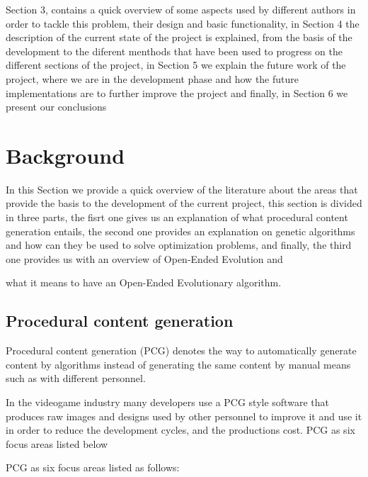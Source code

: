 \documentclass[conference]{IEEEtran}
\begin{document}
Section 3, contains a quick overview of some aspects used by different authors
in order to tackle this problem, their design and basic functionality, in
Section 4 the description of the current state of the project is explained, from
the basis of the development to the diferent menthods that have been used to
progress on the different sections of the project, 
in Section 5 we explain the
future work of the project, where we are in the development phase and how the
future implementations are to further improve the project and finally, in
Section 6 we present our conclusions
 

\section{Background}

In this Section we provide a quick overview of the literature about the areas
that provide the basis to the development of the current project, this section
is divided in three parts, the fisrt one gives us an explanation of what
procedural content generation entails, the second one provides an explanation on
genetic algorithms and how can they be used to solve optimization problems, and
finally, the third one provides us with an overview of Open-Ended Evolution and

what it means to have an Open-Ended Evolutionary algorithm.

\subsection{Procedural content generation}

Procedural content generation (PCG) denotes the way to automatically generate
content by algorithms instead of generating the same content by manual means
such as with different personnel.

In the videogame industry many developers use a PCG style software that produces
raw images and designs used by other personnel to improve it and use it in order
to reduce the development cycles, and the productions cost. PCG as six focus
areas listed below

PCG as six focus areas listed as follows:
\end{document}
